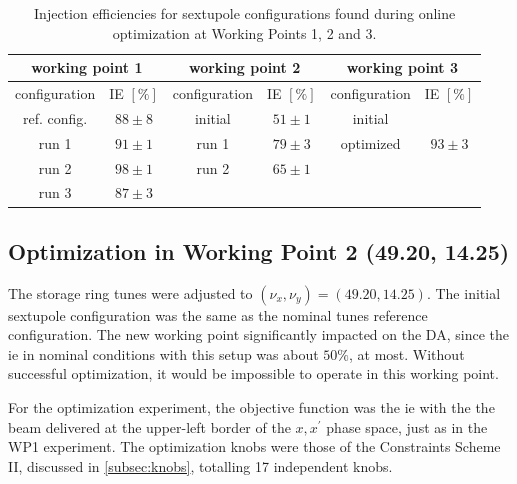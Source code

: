 \begin{table}[htb]
    \caption{Injection efficiencies for sextupole configurations found during online optimization at Working Points 1, 2 and 3.}
    \centering
    \begin{tabular}{cccccc}
    \hline
    \multicolumn{2}{c}{working point 1} & \multicolumn{2}{c}{working point 2}         & \multicolumn{2}{c}{working point 3}         \\ \hline
    configuration      & IE $[\%]$      & configuration        & IE $[\%]$            & configuration        & IE $[\%]$            \\ \hline
    ref. config.       & $88\pm8$       & initial              & $51\pm1$             & initial              &                      \\
    run 1              & $91\pm1$       & run 1                & $79\pm3$             & optimized            & $93\pm3$             \\
    run 2              & $98\pm1$       & run 2                & $65\pm1    $         &                      &                      \\
    run 3              & $87\pm3$       & \multicolumn{1}{l}{} & \multicolumn{1}{l}{} & \multicolumn{1}{l}{} & \multicolumn{1}{l}{} \\ \hline
    \end{tabular}
    \label{table1}
    \end{table}

\subsection{Optimization in Working Point 2 (49.20, 14.25)}
The storage ring tunes were adjusted to $(\nu_x, \nu_y)=(49.20, 14.25)$. The initial sextupole configuration was the same as the nominal tunes reference configuration. The new working point significantly impacted on the \gls*{DA}, since the \gls*{ie} in nominal conditions with this setup was about $50\%$, at most. Without successful optimization, it would be impossible to operate in this working point.

For the optimization experiment, the objective function was the \gls*{ie} with the the beam delivered at the upper-left border of the $x,x^\prime$ phase space, just as in the \gls*{WP1} experiment. The optimization knobs were those of the Constraints Scheme II, discussed in \ref{subsec:knobs}, totalling 17 independent knobs.

